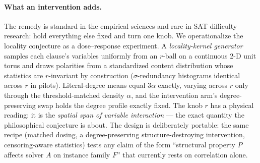 \documentclass[pdflatex,sn-basic,Numbered]{sn-jnl}
\begin{document}
\paragraph{What an intervention adds.}
The remedy is standard in the empirical sciences and rare in SAT difficulty
research: hold everything else fixed and turn one knob. We operationalize the
locality conjecture as a dose--response experiment. A \emph{locality-kernel
generator} samples each clause's variables uniformly from an $r$-ball on a
continuous 2-D unit torus and draws polarities from a standardized content
distribution whose statistics are $r$-invariant by construction
($\sigma$-redundancy histograms identical across $r$ in pilots). Literal-degree
means equal $3\alpha$ exactly, varying across $r$ only through the
threshold-matched density $\alpha$, and the intervention arm's
degree-preserving swap holds the degree profile exactly fixed. The knob $r$ has a physical
reading: it is the \emph{spatial span of variable interaction} --- the exact
quantity the philosophical conjecture is about. The design is deliberately
portable: the same recipe (matched dosing, a degree-preserving
structure-destroying intervention, censoring-aware statistics) tests any
claim of the form ``structural property $P$ affects solver $A$ on instance
family $F$'' that currently rests on correlation alone.
\end{document}
